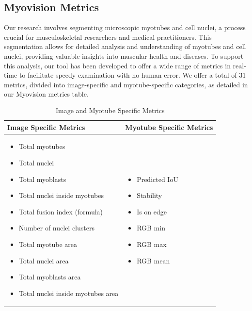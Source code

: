 \subsection{Myovision Metrics}
Our research involves segmenting microscopic myotubes and cell nuclei, a process crucial for musculoskeletal researchers and medical practitioners. This segmentation allows for detailed analysis and understanding of myotubes and cell nuclei, providing valuable insights into muscular health and diseases. To support this analysis, our tool has been developed to offer a wide range of metrics in real-time to facilitate speedy examination with no human error. We offer a total of 31 metrics, divided into image-specific and myotube-specific categories, as detailed in our Myovision metrics table.
\begin{table}[htbp]
	\centering
	\caption{Image and Myotube Specific Metrics}
	\begin{tabular}{|l|l|}
		\hline
		\textbf{Image Specific Metrics} & \textbf{Myotube Specific Metrics} \\
		\hline
		\begin{minipage}[t]{0.45\linewidth}
			\begin{itemize}[nosep,leftmargin=*]
				\item Total myotubes
				\item Total nuclei
				\item Total myoblasts
				\item Total nuclei inside myotubes
				\item Total fusion index (formula)
				\item Number of nuclei clusters
				\item Total myotube area
				\item Total nuclei area
				\item Total myoblasts area
				\item Total nuclei inside myotubes area
			\end{itemize}
		\end{minipage} &
		\begin{minipage}[t]{0.45\linewidth}
			\begin{itemize}[nosep,leftmargin=*]
				\item Predicted IoU
				\item Stability
				\item Is on edge
				\item RGB min
				\item RGB max
				\item RGB mean

\end{itemize}
\end{minipage}
\end{tabular}
\end{table}
